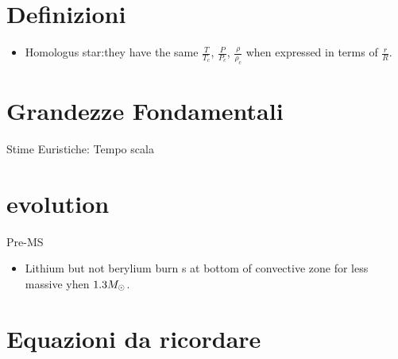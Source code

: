 \section{Definizioni}

\begin{itemize}
    \item  Homologus star:they have the same $\frac{T}{T_c}$, $\frac{P}{P_c}$, $\frac{\rho}{\rho_c}$ when expressed in terms of $\frac{r}{R}$.
\end{itemize}

\section{Grandezze Fondamentali}

 \begin{frame}{Stime Euristiche: Tempo scala}
    
\end{frame}

\section{evolution}

\begin{frame}{Pre-MS}
    \begin{itemize}
        \item Lithium but not berylium burn s at bottom of convective zone for less massive yhen $1.3M_{\odot}{}$.
    \end{itemize}
\end{frame}

\section{Equazioni da ricordare}

